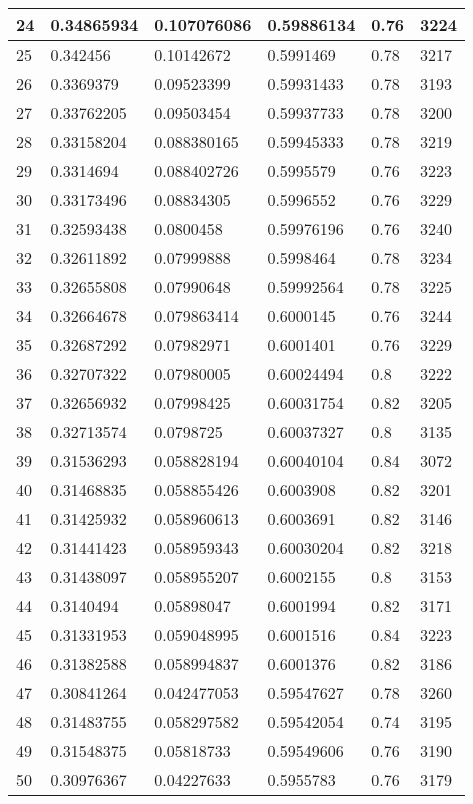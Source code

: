 \begin{longtable}{|l|l|l|l|l|l|}
24 & 0.34865934 & 0.107076086 & 0.59886134 & 0.76 & 3224 \\ \hline 
25 & 0.342456 & 0.10142672 & 0.5991469 & 0.78 & 3217 \\ \hline 
26 & 0.3369379 & 0.09523399 & 0.59931433 & 0.78 & 3193 \\ \hline 
27 & 0.33762205 & 0.09503454 & 0.59937733 & 0.78 & 3200 \\ \hline 
28 & 0.33158204 & 0.088380165 & 0.59945333 & 0.78 & 3219 \\ \hline 
29 & 0.3314694 & 0.088402726 & 0.5995579 & 0.76 & 3223 \\ \hline 
30 & 0.33173496 & 0.08834305 & 0.5996552 & 0.76 & 3229 \\ \hline 
31 & 0.32593438 & 0.0800458 & 0.59976196 & 0.76 & 3240 \\ \hline 
32 & 0.32611892 & 0.07999888 & 0.5998464 & 0.78 & 3234 \\ \hline 
33 & 0.32655808 & 0.07990648 & 0.59992564 & 0.78 & 3225 \\ \hline 
34 & 0.32664678 & 0.079863414 & 0.6000145 & 0.76 & 3244 \\ \hline 
35 & 0.32687292 & 0.07982971 & 0.6001401 & 0.76 & 3229 \\ \hline 
36 & 0.32707322 & 0.07980005 & 0.60024494 & 0.8 & 3222 \\ \hline 
37 & 0.32656932 & 0.07998425 & 0.60031754 & 0.82 & 3205 \\ \hline 
38 & 0.32713574 & 0.0798725 & 0.60037327 & 0.8 & 3135 \\ \hline 
39 & 0.31536293 & 0.058828194 & 0.60040104 & 0.84 & 3072 \\ \hline 
40 & 0.31468835 & 0.058855426 & 0.6003908 & 0.82 & 3201 \\ \hline 
41 & 0.31425932 & 0.058960613 & 0.6003691 & 0.82 & 3146 \\ \hline 
42 & 0.31441423 & 0.058959343 & 0.60030204 & 0.82 & 3218 \\ \hline 
43 & 0.31438097 & 0.058955207 & 0.6002155 & 0.8 & 3153 \\ \hline 
44 & 0.3140494 & 0.05898047 & 0.6001994 & 0.82 & 3171 \\ \hline 
45 & 0.31331953 & 0.059048995 & 0.6001516 & 0.84 & 3223 \\ \hline 
46 & 0.31382588 & 0.058994837 & 0.6001376 & 0.82 & 3186 \\ \hline 
47 & 0.30841264 & 0.042477053 & 0.59547627 & 0.78 & 3260 \\ \hline 
48 & 0.31483755 & 0.058297582 & 0.59542054 & 0.74 & 3195 \\ \hline 
49 & 0.31548375 & 0.05818733 & 0.59549606 & 0.76 & 3190 \\ \hline 
50 & 0.30976367 & 0.04227633 & 0.5955783 & 0.76 & 3179 \\ \hline 
\end{longtable}